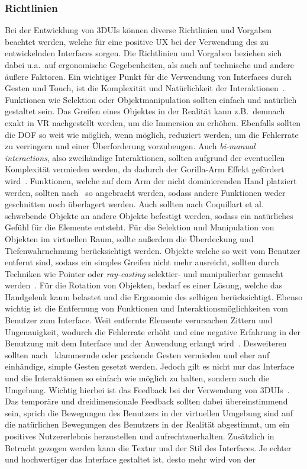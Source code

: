 \subsubsection{Richtlinien}
Bei der Entwicklung von 3DUIs können diverse Richtlinien und Vorgaben beachtet werden, welche für eine positive UX bei der Verwendung des zu entwickelnden Interfaces sorgen. Die Richtlinien und Vorgaben beziehen sich dabei u.a.~auf ergonomische Gegebenheiten, als auch auf technische und andere äußere Faktoren. Ein wichtiger Punkt für die Verwendung von Interfaces durch Gesten und Touch, ist die Komplexität und Natürlichkeit der Interaktionen~\cite{asurveyon3dobjectmanipulation}. Funktionen wie Selektion oder Objektmanipulation sollten einfach und natürlich gestaltet sein. Das Greifen eines Objektes in der Realität kann z.B.~demnach exakt in VR nachgestellt werden, um die Immersion zu erhöhen. Ebenfalls sollten die DOF so weit wie möglich, wenn möglich, reduziert werden, um die Fehlerrate zu verringern und einer Überforderung vorzubeugen. Auch \textit{bi-manual interactions}, also zweihändige Interaktionen, sollten aufgrund der eventuellen Komplexität vermieden werden, da dadurch der Gorilla-Arm Effekt gefördert wird~\cite{asurveyon3dobjectmanipulation}. Funktionen, welche auf dem Arm der nicht dominierenden Hand platziert werden, sollten nach~\cite{constraints3duis} so angebracht werden, sodass andere Funktionen weder geschnitten noch überlagert werden. Auch sollten nach Coquillart et al. schwebende Objekte an andere Objekte befestigt werden, sodass ein natürliches Gefühl für die Elemente entsteht. Für die Selektion und Manipulation von Objekten im virtuellen Raum, sollte außerdem die Überdeckung und Tiefenwahrnehmung berücksichtigt werden. Objekte welche so weit vom Benutzer entfernt sind, sodass ein simples Greifen nicht mehr ausreicht, sollten durch Techniken wie Pointer oder \textit{ray-casting} selektier- und manipulierbar gemacht werden~\cite{anintroductionto3dspacial}. Für die Rotation von Objekten, bedarf es einer Lösung, welche das Handgelenk kaum belastet und die Ergonomie des selbigen berücksichtigt. Ebenso wichtig ist die Entfernung von Funktionen und Interaktionsmöglichkeiten vom Benutzer zum Interface. Weit entfernte Elemente verursachen Zittern und Ungenauigkeit, wodurch die Fehlerrate erhöht und eine negative Erfahrung in der Benutzung mit dem Interface und der Anwendung erlangt wird~\cite{anintroductionto3dspacial}. Desweiteren sollten nach~\cite{virtualrealityandgames} klammernde oder packende Gesten vermieden und eher auf einhändige, simple Gesten gesetzt werden. Jedoch gilt es nicht nur das Interface und die Interaktionen so einfach wie möglich zu halten, sondern auch die Umgebung. Wichtig hierbei ist das Feedback bei der Verwendung von 3DUIs~\cite{theoryandpracticebook}. Das temporäre und dreidimensionale Feedback sollten dabei übereinstimmend sein, sprich die Bewegungen des Benutzers in der virtuellen Umgebung sind auf die natürlichen Bewegungen des Benutzers in der Realität abgestimmt, um ein positives Nutzererlebnis herzustellen und aufrechtzuerhalten. Zusätzlich in Betracht gezogen werden kann die Textur und der Stil des Interfaces. Je echter und hochwertiger das Interface gestaltet ist, desto mehr wird von der 